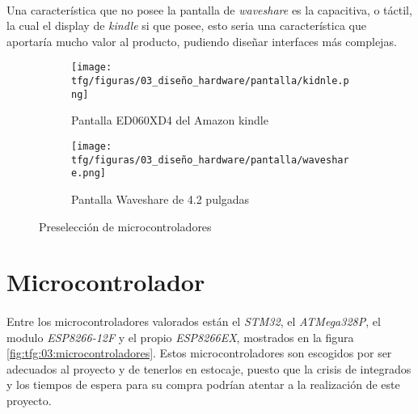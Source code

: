 \paragraph{} Una característica que no posee la pantalla de \textit{waveshare} es la capacitiva, o táctil, la cual el display de \textit{kindle} si que posee, esto seria una característica que aportaría mucho valor al producto, pudiendo diseñar interfaces más complejas.

\begin{figure}[!htb]
    \centering
    \begin{subfigure}[b]{.475\textwidth}
        \centering
        \texttt{[image: tfg/figuras/03\_diseño\_hardware/pantalla/kidnle.png]}
        \caption{Pantalla ED060XD4 del Amazon kindle}
        \label{fig:tfg:03:kindle}
    \end{subfigure}
    \hfill
    \begin{subfigure}[b]{.475\textwidth}
        \centering
        \texttt{[image: tfg/figuras/03\_diseño\_hardware/pantalla/waveshare.png]}
        \caption{Pantalla Waveshare de 4.2 pulgadas}
        \label{fig:tfg:03:waveshare}
    \end{subfigure}
    \caption{Preselección de microcontroladores}
    \label{fig:tfg:03:pantallas}
\end{figure}


\section{Microcontrolador}

\paragraph{} Entre los microcontroladores valorados están el \textit{STM32}, el \textit{ATMega328P}, el modulo \textit{ESP8266-12F} y el propio \textit{ESP8266EX}, mostrados en la figura \ref{fig:tfg:03:microcontroladores}. Estos microcontroladores son escogidos por ser adecuados al proyecto y de tenerlos en estocaje, puesto que la crisis de integrados y los tiempos de espera para su compra podrían atentar a la realización de este proyecto.

